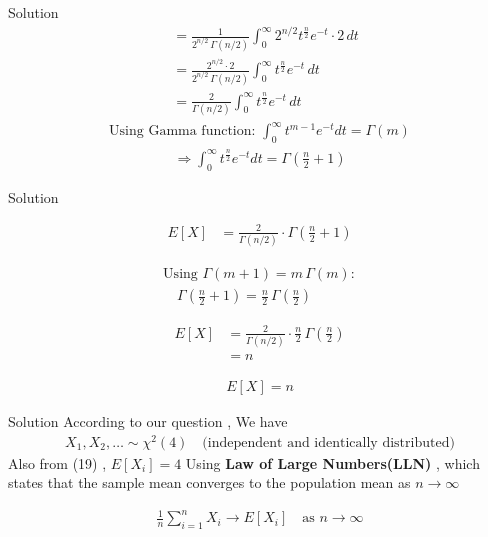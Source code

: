 \documentclass{beamer}
\begin{document}
\begin{frame}{Solution}
\begin{align}
&= \frac{1}{2^{n/2}\,\Gamma(n/2)} 
\int_{0}^{\infty} 2^{n/2} t^{\frac{n}{2}} e^{-t} \cdot 2\,dt \\
&= \frac{2^{n/2} \cdot 2}{2^{n/2}\,\Gamma(n/2)} 
\int_{0}^{\infty} t^{\frac{n}{2}} e^{-t}\,dt \\
&= \frac{2}{\Gamma(n/2)} 
\int_{0}^{\infty} t^{\frac{n}{2}} e^{-t}\,dt
\end{align}
\begin{align}
\text{Using Gamma function: } 
\int_{0}^{\infty} t^{m-1} e^{-t} dt = \Gamma(m)
\end{align}
\begin{align}
\Rightarrow \int_{0}^{\infty} t^{\frac{n}{2}} e^{-t} dt 
= \Gamma\!\left(\frac{n}{2} + 1\right)
\end{align}
\end{frame}
\begin{frame}{Solution}


\begin{align}
E[X] &= \frac{2}{\Gamma(n/2)} \cdot \Gamma\!\left(\frac{n}{2} + 1\right)
\end{align}

\begin{align}
\text{Using } \Gamma(m+1) = m\,\Gamma(m): \\
\quad \Gamma\!\left(\frac{n}{2} + 1\right) 
= \frac{n}{2}\,\Gamma\!\left(\frac{n}{2}\right)
\end{align}

\begin{align}
E[X] &= \frac{2}{\Gamma(n/2)} \cdot \frac{n}{2}\,\Gamma\!\left(\frac{n}{2}\right) \\
&= n
\end{align}

\begin{align}
\boxed{E[X] = n}
\end{align}
\end{frame}

\begin{frame}{Solution}
According to our question , 
We have \\
\begin{align}
X_1, X_2, \ldots \sim \chi^2(4) \quad \text{(independent and identically distributed)}
\end{align}
Also from (19) , $E[X_i] = 4$
 Using \textbf{Law of Large Numbers(LLN)} , which states that the sample mean converges to the population mean as $n \to \infty$

 \begin{align}
\frac{1}{n}\sum_{i=1}^n X_i \xrightarrow{} {E}[X_i] \quad \text{as } n \to \infty
 \end{align}
\end{frame}
\end{document}
